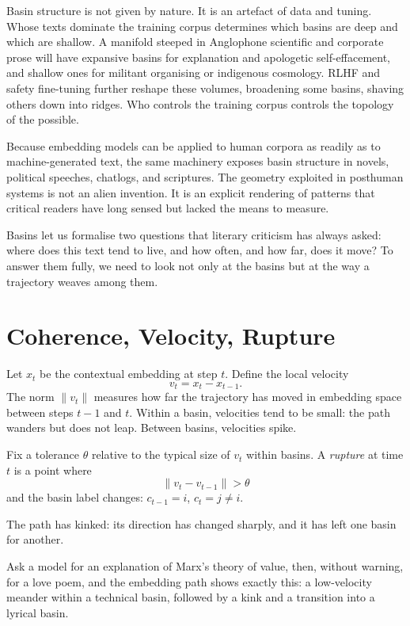 \documentclass[12pt,a4paper]{article}
\begin{document}
Basin structure is not given by nature. It is an artefact of data and tuning. Whose texts dominate the training corpus determines which basins are deep and which are shallow. A manifold steeped in Anglophone scientific and corporate prose will have expansive basins for explanation and apologetic self-effacement, and shallow ones for militant organising or indigenous cosmology. RLHF and safety fine-tuning further reshape these volumes, broadening some basins, shaving others down into ridges. Who controls the training corpus controls the topology of the possible.

Because embedding models can be applied to human corpora as readily as to machine-generated text, the same machinery exposes basin structure in novels, political speeches, chatlogs, and scriptures. The geometry exploited in posthuman systems is not an alien invention. It is an explicit rendering of patterns that critical readers have long sensed but lacked the means to measure.

Basins let us formalise two questions that literary criticism has always asked: where does this text tend to live, and how often, and how far, does it move? To answer them fully, we need to look not only at the basins but at the way a trajectory weaves among them.


\section{Coherence, Velocity, Rupture}

Let $x_t$ be the contextual embedding at step $t$. Define the local velocity
\[
v_t = x_t - x_{t-1}.
\]
The norm $\|v_t\|$ measures how far the trajectory has moved in embedding space between steps $t-1$ and $t$. Within a basin, velocities tend to be small: the path wanders but does not leap. Between basins, velocities spike.

\begin{formalbox}[title={Rupture as Kink in the Trajectory}]
Fix a tolerance $\theta$ relative to the typical size of $v_t$ within basins. A \emph{rupture} at time $t$ is a point where
\[
\|v_t - v_{t-1}\| > \theta
\]
and the basin label changes: $c_{t-1} = i$, $c_t = j \neq i$.

The path has kinked: its direction has changed sharply, and it has left one basin for another.
\end{formalbox}

Ask a model for an explanation of Marx's theory of value, then, without warning, for a love poem, and the embedding path shows exactly this: a low-velocity meander within a technical basin, followed by a kink and a transition into a lyrical basin.
\end{document}

